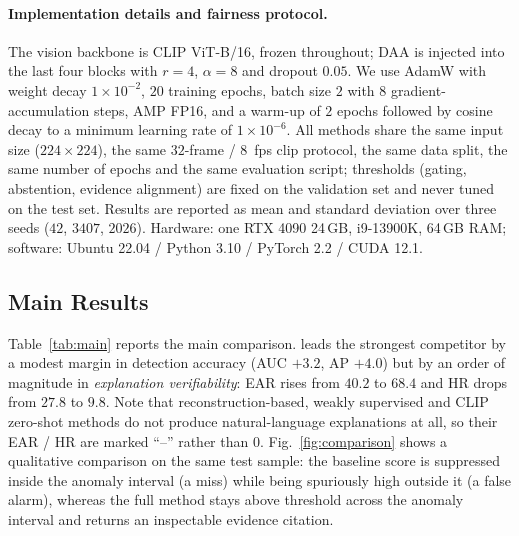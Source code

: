 \paragraph{Implementation details and fairness protocol.} The vision backbone is CLIP ViT-B/16, frozen throughout; DAA is injected into the last four blocks with $r{=}4$, $\alpha{=}8$ and dropout $0.05$. We use AdamW with weight decay $1\times10^{-2}$, $20$ training epochs, batch size $2$ with $8$ gradient-accumulation steps, AMP FP16, and a warm-up of $2$ epochs followed by cosine decay to a minimum learning rate of $1\times10^{-6}$. All methods share the same input size ($224\times224$), the same $32$-frame / $8$~fps clip protocol, the same data split, the same number of epochs and the same evaluation script; thresholds (gating, abstention, evidence alignment) are fixed on the validation set and never tuned on the test set. Results are reported as mean and standard deviation over three seeds ($42$, $3407$, $2026$). Hardware: one RTX 4090 24\,GB, i9-13900K, 64\,GB RAM; software: Ubuntu 22.04 / Python 3.10 / PyTorch 2.2 / CUDA 12.1.

\subsection{Main Results}

Table~\ref{tab:main} reports the main comparison. \evivad{} leads the strongest competitor by a modest margin in detection accuracy (AUC $+3.2$, AP $+4.0$) but by an order of magnitude in \emph{explanation verifiability}: EAR rises from $40.2$ to $68.4$ and HR drops from $27.8$ to $9.8$. Note that reconstruction-based, weakly supervised and CLIP zero-shot methods do not produce natural-language explanations at all, so their EAR / HR are marked ``--'' rather than $0$. Fig.~\ref{fig:comparison} shows a qualitative comparison on the same test sample: the baseline score is suppressed inside the anomaly interval (a miss) while being spuriously high outside it (a false alarm), whereas the full method stays above threshold across the anomaly interval and returns an inspectable evidence citation.

